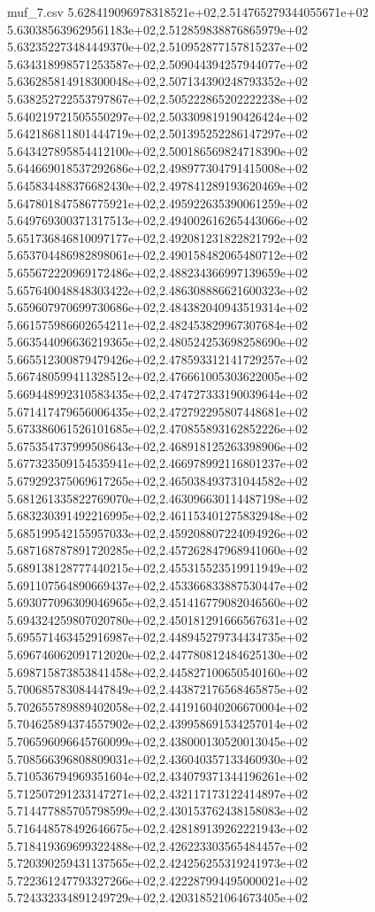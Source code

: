 \begin{filecontents*}{muf_7.csv}
5.628419096978318521e+02,2.514765279344055671e+02
5.630385639629561183e+02,2.512859838876865979e+02
5.632352273484449370e+02,2.510952877157815237e+02
5.634318998571253587e+02,2.509044394257944077e+02
5.636285814918300048e+02,2.507134390248793352e+02
5.638252722553797867e+02,2.505222865202222238e+02
5.640219721505550297e+02,2.503309819190426424e+02
5.642186811801444719e+02,2.501395252286147297e+02
5.643427895854412100e+02,2.500186569824718390e+02
5.644669018537292686e+02,2.498977304791415008e+02
5.645834488376682430e+02,2.497841289193620469e+02
5.647801847586775921e+02,2.495922635390061259e+02
5.649769300371317513e+02,2.494002616265443066e+02
5.651736846810097177e+02,2.492081231822821792e+02
5.653704486982898061e+02,2.490158482065480712e+02
5.655672220969172486e+02,2.488234366997139659e+02
5.657640048848303422e+02,2.486308886621600323e+02
5.659607970699730686e+02,2.484382040943519314e+02
5.661575986602654211e+02,2.482453829967307684e+02
5.663544096636219365e+02,2.480524253698258690e+02
5.665512300879479426e+02,2.478593312141729257e+02
5.667480599411328512e+02,2.476661005303622005e+02
5.669448992310583435e+02,2.474727333190039644e+02
5.671417479656006435e+02,2.472792295807448681e+02
5.673386061526101685e+02,2.470855893162852226e+02
5.675354737999508643e+02,2.468918125263398906e+02
5.677323509154535941e+02,2.466978992116801237e+02
5.679292375069617265e+02,2.465038493731044582e+02
5.681261335822769070e+02,2.463096630114487198e+02
5.683230391492216995e+02,2.461153401275832948e+02
5.685199542155957033e+02,2.459208807224094926e+02
5.687168787891720285e+02,2.457262847968941060e+02
5.689138128777440215e+02,2.455315523519911949e+02
5.691107564890669437e+02,2.453366833887530447e+02
5.693077096309046965e+02,2.451416779082046560e+02
5.694324259807020780e+02,2.450181291666567631e+02
5.695571463452916987e+02,2.448945279734434735e+02
5.696746062091712020e+02,2.447780812484625130e+02
5.698715873853841458e+02,2.445827100650540160e+02
5.700685783084447849e+02,2.443872176568465875e+02
5.702655789889402058e+02,2.441916040206670004e+02
5.704625894374557902e+02,2.439958691534257014e+02
5.706596096645760099e+02,2.438000130520013045e+02
5.708566396808809031e+02,2.436040357133460930e+02
5.710536794969351604e+02,2.434079371344196261e+02
5.712507291233147271e+02,2.432117173122414897e+02
5.714477885705798599e+02,2.430153762438158083e+02
5.716448578492646675e+02,2.428189139262221943e+02
5.718419369699322488e+02,2.426223303565484457e+02
5.720390259431137565e+02,2.424256255319241973e+02
5.722361247793327266e+02,2.422287994495000021e+02
5.724332334891249729e+02,2.420318521064673405e+02

\end{filecontents*}
